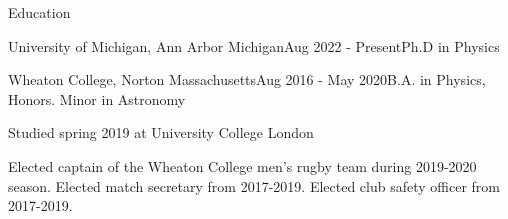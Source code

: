 \documentclass{resume} %
\begin{document}
\begin{rSection}{Education}
    \begin{rSubsection}
        {University of Michigan, Ann Arbor Michigan}{Aug 2022 - Present}{Ph.D in Physics}{}
        
    \end{rSubsection}

\begin{rSubsection}
    {Wheaton College, Norton Massachusetts}{Aug 2016 - May 2020}{B.A. in Physics, Honors. Minor in Astronomy}{}
    \item Studied spring 2019 at University College London
    \item Elected captain of the Wheaton College men's rugby team during 2019-2020 season. Elected match secretary from 2017-2019. Elected club safety officer from 2017-2019.
\end{rSubsection}


\end{rSection}
\end{document}
